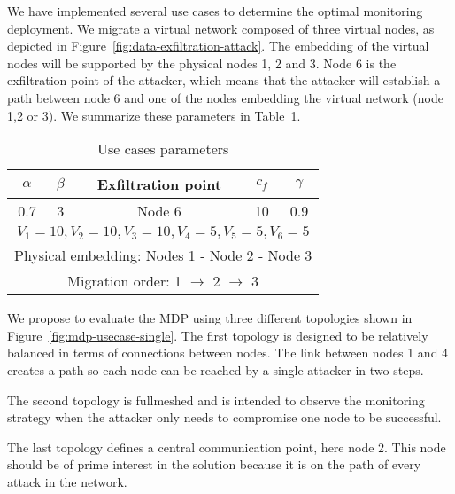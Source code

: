 We have implemented several use cases to determine the optimal monitoring deployment.
We migrate a virtual network composed of three virtual nodes, as depicted in Figure~\ref{fig:data-exfiltration-attack}.
The embedding of the virtual nodes will be supported by the physical nodes 1, 2 and 3.
Node 6 is the exfiltration point of the attacker, which means that the attacker will establish a path between node 6 and one of the nodes embedding the virtual network (\ie node 1,2 or 3).
We summarize these parameters in Table~\ref{tab:mdp-parameters}.

\begin{table}[h]
\centering
\begin{tabular}{|c|c|l|c|c|c|}
\hline
$\alpha$ & \multicolumn{2}{c|}{$\beta$} & Exfiltration point & $c_f$ & $\gamma$ \\ \hline
0.7      & \multicolumn{2}{c|}{3}       & Node 6             & 10    & 0.9      \\ \hline
\multicolumn{6}{|c|}{$V_1=10,V_2=10,V_3=10,V_4=5,V_5=5,V_6=5$}                             \\ \hline
\multicolumn{6}{|l|}{Physical embedding: Nodes 1 - Node 2 - Node 3}             \\ \hline
\multicolumn{6}{|c|}{Migration order: 1 $\rightarrow$ 2 $\rightarrow$ 3}                              \\ \hline
\end{tabular}
\caption{Use cases parameters}
\label{tab:mdp-parameters}
\end{table}

We propose to evaluate the MDP using three different topologies shown in Figure~\ref{fig:mdp-usecase-single}. The first topology is designed to be relatively balanced in terms of connections between nodes. The link between nodes 1 and 4 creates a path so each node can be reached by a single attacker in two steps.

The second topology is fullmeshed and is intended to observe the monitoring strategy when the attacker only needs to compromise one node to be successful.

 The last topology defines a central communication point, here node 2. This node should be of prime interest in the solution because it is on the path of every attack in the network.



